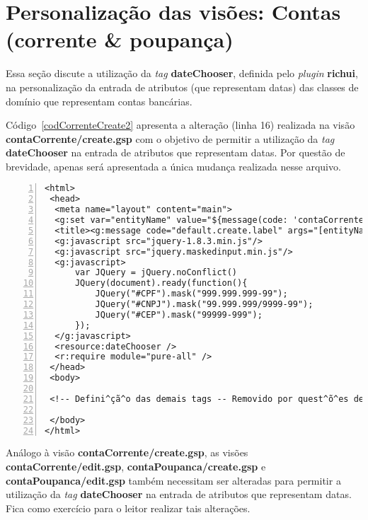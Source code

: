 \newpage

\section{Personalização das visões: Contas (corrente \& poupança)}

\vspace{0.5cm}

Essa seção  discute a utilização da  {\it tag} {\bf  dateChooser}, definida pelo
{\it  plugin} {\bf  richui},  na  personalização da  entrada  de atributos  (que
representam datas) das classes de domínio que representam contas bancárias. 

Código~\ref{codCorrenteCreate2}  apresenta a  alteração (linha  16)  realizada na
visão {\bf contaCorrente/create.gsp} com o  objetivo de permitir a utilização da
{\it tag} {\bf  dateChooser} na entrada de atributos  que representam datas. Por
questão de  brevidade, apenas será  apresentada a única mudança  realizada nesse
arquivo.  

\vspace{0.3cm}

 \begin{lstlisting}[numbers=left,  caption=Visão {\bf contaCorrente/create.gsp},
     frame=trBL, float=htbp, label=codCorrenteCreate2] 
<html>
 <head>
  <meta name="layout" content="main">
  <g:set var="entityName" value="${message(code: 'contaCorrente.label', default: 'ContaCorrente')}" />
  <title><g:message code="default.create.label" args="[entityName]" /></title>
  <g:javascript src="jquery-1.8.3.min.js"/>
  <g:javascript src="jquery.maskedinput.min.js"/> 
  <g:javascript>
      var JQuery = jQuery.noConflict()
      JQuery(document).ready(function(){
          JQuery("#CPF").mask("999.999.999-99");
          JQuery("#CNPJ").mask("99.999.999/9999-99");
          JQuery("#CEP").mask("99999-999");
      });
  </g:javascript>
  <resource:dateChooser />
  <r:require module="pure-all" />
 </head>
 <body>

 <!-- Defini^çã^o das demais tags -- Removido por quest^õ^es de brevidade --> 

 </body>
</html>
\end{lstlisting}

\begin{remark}
Análogo    à   visão    {\bf   contaCorrente/create.gsp},    as    visões   {\bf
  contaCorrente/edit.gsp},     {\bf     contaPoupanca/create.gsp}     e     {\bf
  contaPoupanca/edit.gsp}  também  necessitam  ser  alteradas  para  permitir  a
utilização  da  {\it  tag}  {\bf   dateChooser}  na  entrada  de  atributos  que
representam datas.  Fica como exercício para o leitor realizar tais alterações.  
\end{remark}

